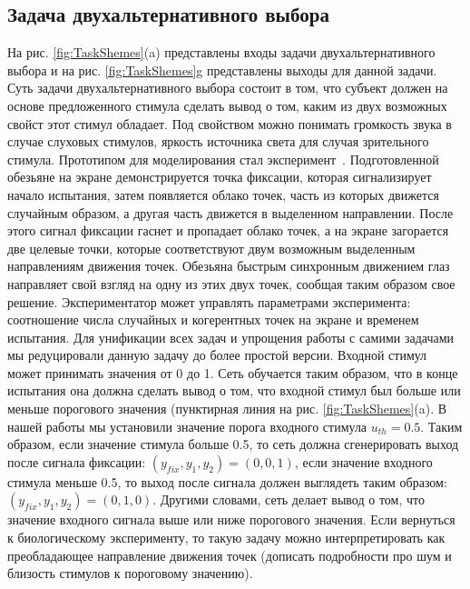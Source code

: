 \documentclass{article}
\begin{document}
\subsection{Задача двухальтернативного выбора}

На рис. \ref{fig:TaskShemes}(a) представлены входы задачи двухальтернативного выбора и на рис. \ref{fig:TaskShemes}{g} представлены выходы для данной задачи. Суть задачи двухальтернативного выбора состоит в том, что субъект должен на основе предложенного стимула сделать вывод о том, каким из двух возможных свойст этот стимул обладает. Под свойством можно понимать громкость звука в случае слуховых стимулов, яркость источника света для случая зрительного стимула. Прототипом для моделирования стал эксперимент~\cite{britten1992analysis}. Подготовленной обезьяне на экране демонстрируется точка фиксации, которая сигнализирует начало испытания, затем появляется облако точек, часть из которых движется случайным образом, а другая часть движется в выделенном направлении. После этого сигнал фиксации гаснет и пропадает облако точек, а на экране загорается две целевые точки, которые соответствуют двум возможным выделенным направлениям движения точек. Обезьяна быстрым синхронным движением глаз направляет свой взгляд на одну из этих двух точек, сообщая таким образом свое решение. Экспериментатор может управлять параметрами эксперимента: соотношение числа случайных и когерентных точек на экране и временем испытания. Для унификации всех задач и упрощения работы с самими задачами мы редуцировали данную задачу до более простой версии. Входной стимул может принимать значения от 0 до 1. Сеть обучается таким образом, что в конце испытания она должна сделать вывод о том, что входной стимул был больше или меньше порогового значения (пунктирная линия на рис. \ref{fig:TaskShemes}(a). В нашей работы мы установили значение порога входного стимула $u_{th} = 0.5$. Таким образом, если значение стимула больше 0.5, то сеть должна сгенерировать выход после сигнала фиксации: $(y_{fix}, y_1, y_2) = (0, 0, 1)$, если значение входного стимула меньше 0.5, то выход после сигнала должен выглядеть таким образом: $(y_{fix}, y_1, y_2) = (0, 1, 0)$. Другими словами, сеть делает вывод о том, что значение входного сигнала выше или ниже порогового значения. Если вернуться к биологическому эксперименту, то такую задачу можно интерпретировать как преобладающее направление движения точек (дописать подробности про шум и близость стимулов к пороговому значению).
\end{document}
